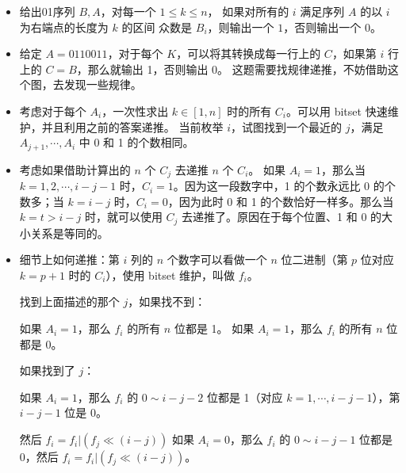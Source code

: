 \documentclass[a4paper,12pt]{article}
\begin{document}
\begin{itemize}
    \item 给出01序列 \(B, A\)，对每一个 \(1 \leq k \leq n\)，
    如果对所有的 \(i\) 满足序列 \(A\) 的以 \(i\) 为右端点的长度为 \(k\) 的区间
    众数是 \(B_i\)，则输出一个 \(1\)，否则输出一个 \(0\)。

    \item 给定 \( A = 0110011 \)，对于每个 \( K \)，可以将其转换成每一行上的 \( C \)，如果第 \( i \) 行上的 \( C = B \)，那么就输出 1，否则输出 0。
    这题需要找规律递推，不妨借助这个图，去发现一些规律。
    
    \item 考虑对于每个 \( A_i \)，一次性求出 \( k \in [1, n] \) 时的所有 \( C_i \)。可以用 bitset 快速维护，并且利用之前的答案递推。
    当前枚举 \( i \)，试图找到一个最近的 \( j \)，满足 \( A_{j+1}, \cdots, A_i \) 中 0 和 1 的个数相同。
    
    \item 考虑如果借助计算出的 \( n \) 个 \( C_j \) 去递推 \( n \) 个 \( C_i \)。
    如果 \( A_i = 1 \)，那么当 \( k = 1, 2, \cdots, i - j - 1 \) 时，\( C_i = 1 \)。因为这一段数字中，1 的个数永远比 0 的个数多；当 \( k = i - j \) 时，\( C_i = 0 \)，因为此时 0 和 1 的个数恰好一样多。那么当 \( k = t > i - j \) 时，就可以使用 \( C_j \) 去递推了。原因在于每个位置、1 和 0 的大小关系是等同的。

    \item
    细节上如何递推：第 \(i\) 列的 \(n\) 个数字可以看做一个 \(n\) 位二进制（第 \(p\) 位对应 \(k=p+1\) 时的 \(C_i\)），使用 bitset 维护，叫做 \(f_i\)。

    找到上面描述的那个 \(j\)，如果找不到：

    如果 \(A_i=1\)，那么 \(f_i\) 的所有 \(n\) 位都是 1。
    如果 \(A_i=1\)，那么 \(f_i\) 的所有 \(n\) 位都是 0。
    
    如果找到了 \(j\)：

    如果 \(A_i = 1\)，那么 \(f_i\) 的 \(0\sim i-j-2\) 位都是 1（对应 \(k=1,\cdots,i-j-1\)），第 \(i-j-1\) 位是 0。
    
    然后 \(f_i = f_i | (f_{j}\ll (i-j))\)
    如果 \(A_i=0\)，那么 \(f_i\) 的 \(0\sim i-j-1\) 位都是 0，然后 \(f_i = f_i|(f_j\ll (i-j))\)。
\end{itemize}
\end{document}
